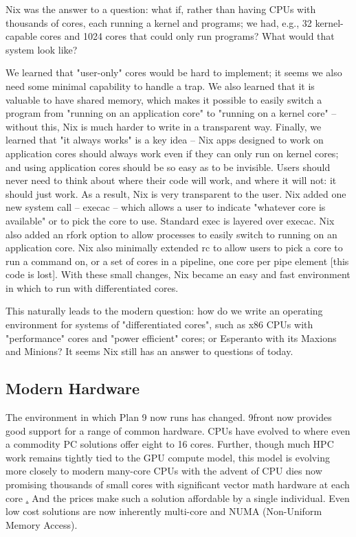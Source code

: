 \documentclass{article}
\begin{document}
Nix was the answer to a question: what if, rather than having CPUs with thousands of cores, each running a kernel and programs; we had, e.g., 32 kernel-capable cores and 1024 cores that could only run programs?
What would that system look like? 

We learned that "user-only" cores would be hard to implement; it seems we also need some minimal capability to handle a trap. We also learned that it is valuable to have shared memory, which makes it possible to easily switch a program from "running on an application core" to "running on a kernel core" -- without this, Nix is much harder to write in a transparent way.
Finally, we learned that "it always works" is a key idea -- Nix apps designed to work on application cores should always work even if they can only run on kernel cores; and using application cores should be so easy as to be invisible.
Users should never need to think about where their code will work, and where it will not: it should just work.
As a result, Nix is very transparent to the user.
Nix added one new system call -- execac -- which allows a user to indicate "whatever core is available" or to pick the core to use.
Standard exec is layered over execac.
Nix also added an rfork option to allow processes to easily switch to running on an application core.
Nix also minimally extended rc to allow users to pick a core to run a command on, or a set of cores in a pipeline, one core per pipe element [this code is lost].
With these small changes, Nix became an easy and fast environment in which to run with differentiated cores.

This naturally leads to the modern question: how do we write an operating environment for systems of "differentiated cores", such as x86 CPUs with "performance" cores and "power efficient" cores; or Esperanto with its Maxions and Minions?
It seems Nix still has an answer to questions of today.

\subsection{Modern Hardware}
The environment in which Plan 9 now runs has changed.
9front now provides good support for a range of common hardware.
CPUs have evolved to where even a commodity PC solutions offer eight to 16 cores.
Further, though much HPC work remains tightly tied to the GPU compute model, this model is evolving more closely to modern many-core CPUs with the advent of CPU dies now promising thousands of small cores with significant vector math hardware at each core \href{https://www.esperanto.ai/technology/}.
And the prices make such a solution affordable by a single individual.
Even low cost solutions are now inherently multi-core and NUMA (Non-Uniform Memory Access).
\end{document}
